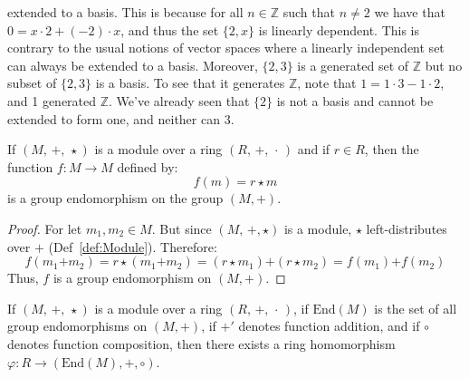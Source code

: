     extended to a basis. This is because for all $n\in\mathbb{Z}$ such that
    $n\ne{2}$ we have that $0=x\cdot{2}+(\minus{2})\cdot{x}$, and thus the set
    $\{2,x\}$ is linearly dependent. This is contrary to the usual notions of
    vector spaces where a linearly independent set can always be extended to a
    basis. Moreover, $\{2,3\}$ is a generated set of $\mathbb{Z}$ but no subset
    of $\{2,3\}$ is a basis. To see that it generates $\mathbb{Z}$, note that
    $1=1\cdot{3}-1\cdot{2}$, and 1 generated $\mathbb{Z}$. We've already seen
    that $\{2\}$ is not a basis and cannot be extended to form one, and neither
    can 3.
    \begin{theorem}
        \label{thm:Scalar_Mult_in_Module_Defines_Group_Endo}%
        If $(M,\,\boldsymbol{+},\,\star)$ is a module over a ring
        $(R,\,+,\,\cdot\,)$ and if $r\in{R}$, then the function
        $f:M\rightarrow{M}$ defined by:
        \begin{equation}
            f(m)=r\star{m}
        \end{equation}
        is a group endomorphism on the group $(M,\boldsymbol{+})$.
    \end{theorem}
    \begin{proof}
        For let $m_{1},m_{2}\in{M}$. But since $(M,\,\boldsymbol{+},\star)$
        is a module, $\star$ left-distributes over $\boldsymbol{+}$
        (Def~\ref{def:Module}). Therefore:
        \begin{equation}
            f(m_{1}\boldsymbol{+}m_{2})
            =r\star(m_{1}\boldsymbol{+}m_{2})
            =(r\star{m}_{1})\boldsymbol{+}(r\star{m}_{2})
            =f(m_{1})\boldsymbol{+}f(m_{2})
        \end{equation}
        Thus, $f$ is a group endomorphism on $(M,\boldsymbol{+})$.
    \end{proof}
    \begin{theorem}
        If $(M,\,\boldsymbol{+},\,\star)$ is a module over a ring
        $(R,\,+,\,\cdot\,)$, if $\textrm{End}(M)$ is the set of all
        group endomorphisms on $(M,\boldsymbol{+})$, if $\boldsymbol{+}'$
        denotes function addition, and if $\circ$ denotes function composition,
        then there exists a ring homomorphism
        $\varphi:R\rightarrow(\textrm{End}(M),\boldsymbol{+},\circ)$.
    \end{theorem}
